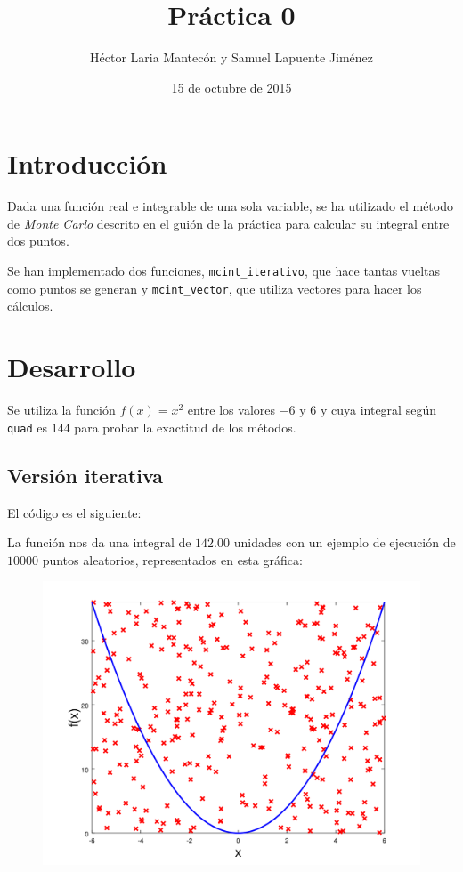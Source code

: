 \documentclass{article}
\title{Práctica 0}
\author{Héctor Laria Mantecón y Samuel Lapuente Jiménez}
\date{15 de octubre de 2015}
\begin{document}
\maketitle
\section{Introducción}
Dada una función real e integrable de una sola variable, se ha utilizado 
el método de {\it Monte Carlo} descrito en el guión de la práctica para 
calcular su integral entre dos puntos.

Se han implementado dos funciones, {\tt mcint\_iterativo}, que hace 
tantas vueltas como puntos se generan y {\tt mcint\_vector}, que utiliza 
vectores para hacer los cálculos.

\section{Desarrollo}
Se utiliza la función $f(x) = x^2$ entre los valores $-6$ y $6$ y cuya 
integral según {\tt quad} es $144$ para probar la exactitud de los 
métodos.

\subsection{Versión iterativa}
El código es el siguiente:


La función nos da una integral de $142.00$ unidades con un ejemplo de 
ejecución de $10000$ puntos aleatorios, representados en esta gráfica:
\begin{figure}[h]
\centering
\includegraphics[width=12cm]{iterativo}
\end{figure}
\end{document}
